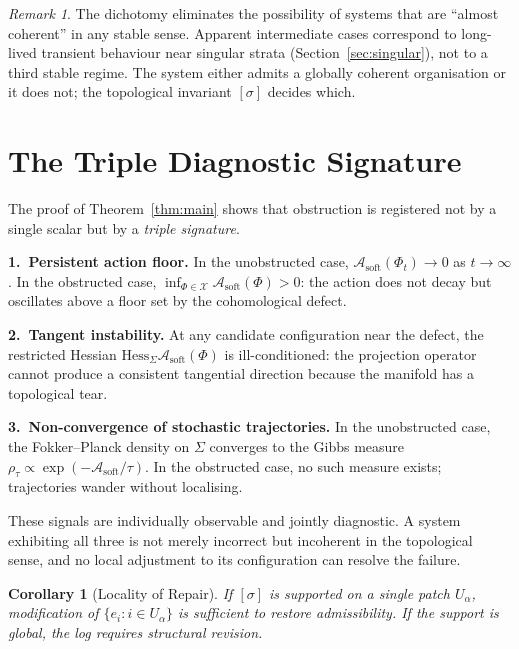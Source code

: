 \documentclass[12pt,oneside]{article}
\theoremstyle{plain}
\newtheorem{corollary}[theorem]{Corollary}
\theoremstyle{definition}
\theoremstyle{remark}
\newtheorem{remark}[theorem]{Remark}
\newcommand{\X}{\mathcal{X}}
\newcommand{\Sig}{\Sigma}
\newcommand{\rhotau}{\rho_\tau}
\newcommand{\Asoft}{\mathcal{A}_{\mathrm{soft}}}
\newcommand{\HessSig}{\mathrm{Hess}_{\Sigma}}
\begin{document}
\begin{remark}
The dichotomy eliminates the possibility of systems that are ``almost coherent''
in any stable sense. Apparent intermediate cases correspond to long-lived
transient behaviour near singular strata (Section~\ref{sec:singular}), not to a
third stable regime. The system either admits a globally coherent organisation or
it does not; the topological invariant $[\sigma]$ decides which.
\end{remark}

\section{The Triple Diagnostic Signature}
\label{sec:diagnostic}

The proof of Theorem~\ref{thm:main} shows that obstruction is registered not by
a single scalar but by a \emph{triple signature}.

\medskip\noindent\textbf{1.~Persistent action floor.} In the unobstructed case,
$\Asoft(\Phi_t) \to 0$ as $t \to \infty$. In the obstructed case,
$\inf_{\Phi\in\X}\Asoft(\Phi) > 0$: the action does not decay but oscillates
above a floor set by the cohomological defect.

\medskip\noindent\textbf{2.~Tangent instability.} At any candidate configuration
near the defect, the restricted Hessian $\HessSig\Asoft(\Phi)$ is
ill-conditioned: the projection operator cannot produce a consistent tangential
direction because the manifold has a topological tear.

\medskip\noindent\textbf{3.~Non-convergence of stochastic trajectories.} In the
unobstructed case, the Fokker--Planck density on $\Sig$ converges to the Gibbs
measure $\rhotau \propto \exp(-\Asoft/\tau)$. In the obstructed case, no such
measure exists; trajectories wander without localising.

These signals are individually observable and jointly diagnostic. A system
exhibiting all three is not merely incorrect but incoherent in the topological
sense, and no local adjustment to its configuration can resolve the failure.

\begin{corollary}[Locality of Repair]
\label{cor:repair}
If $[\sigma]$ is supported on a single patch $U_\alpha$, modification of
$\{e_i : i \in U_\alpha\}$ is sufficient to restore admissibility. If the
support is global, the log requires structural revision.
\end{corollary}
\end{document}
